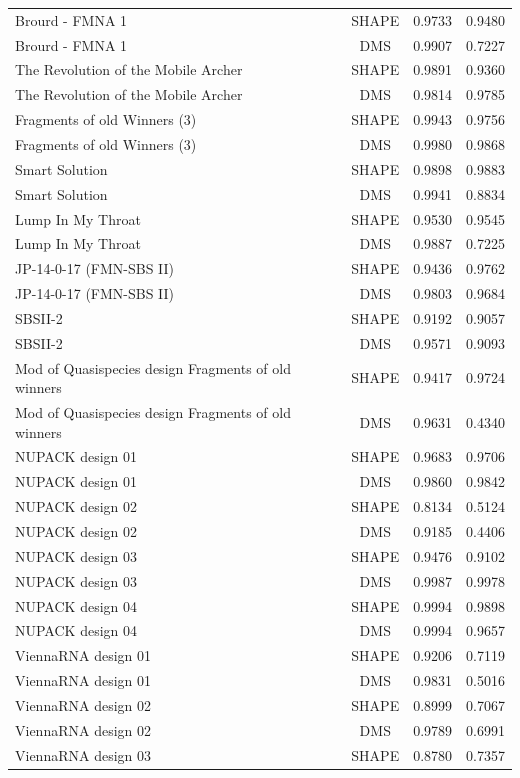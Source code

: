 \documentclass[letter]{bioinfo}
\begin{document}
\begin{center}
\begin{longtable}{lccc}
Brourd - FMNA 1	&	SHAPE	&	0.9733 	&	0.9480 	\\
Brourd - FMNA 1	&	DMS	&	0.9907 	&	0.7227 	\\
The Revolution of the Mobile Archer	&	SHAPE	&	0.9891 	&	0.9360 	\\
The Revolution of the Mobile Archer	&	DMS	&	0.9814 	&	0.9785 	\\
Fragments of old Winners (3)	&	SHAPE	&	0.9943 	&	0.9756 	\\
Fragments of old Winners (3)	&	DMS	&	0.9980 	&	0.9868 	\\
Smart Solution	&	SHAPE	&	0.9898 	&	0.9883 	\\
Smart Solution	&	DMS	&	0.9941 	&	0.8834 	\\
Lump In My Throat	&	SHAPE	&	0.9530 	&	0.9545 	\\
Lump In My Throat	&	DMS	&	0.9887 	&	0.7225 	\\
JP-14-0-17 (FMN-SBS II)	&	SHAPE	&	0.9436 	&	0.9762 	\\
JP-14-0-17 (FMN-SBS II)	&	DMS	&	0.9803 	&	0.9684 	\\
SBSII-2	&	SHAPE	&	0.9192 	&	0.9057 	\\
SBSII-2	&	DMS	&	0.9571 	&	0.9093 	\\
Mod of Quasispecies design Fragments of old winners	&	SHAPE	&	0.9417 	&	0.9724 	\\
Mod of Quasispecies design Fragments of old winners	&	DMS	&	0.9631 	&	0.4340 	\\
NUPACK design 01	&	SHAPE	&	0.9683 	&	0.9706 	\\
NUPACK design 01	&	DMS	&	0.9860 	&	0.9842 	\\
NUPACK design 02	&	SHAPE	&	0.8134 	&	0.5124 	\\
NUPACK design 02	&	DMS	&	0.9185 	&	0.4406 	\\
NUPACK design 03	&	SHAPE	&	0.9476 	&	0.9102 	\\
NUPACK design 03	&	DMS	&	0.9987 	&	0.9978 	\\
NUPACK design 04	&	SHAPE	&	0.9994 	&	0.9898 	\\
NUPACK design 04	&	DMS	&	0.9994 	&	0.9657 	\\
ViennaRNA design 01	&	SHAPE	&	0.9206 	&	0.7119 	\\
ViennaRNA design 01	&	DMS	&	0.9831 	&	0.5016 	\\
ViennaRNA design 02	&	SHAPE	&	0.8999 	&	0.7067 	\\
ViennaRNA design 02	&	DMS	&	0.9789 	&	0.6991 	\\
ViennaRNA design 03	&	SHAPE	&	0.8780 	&	0.7357 	\\

\end{longtable}
\end{center}
\end{document}
